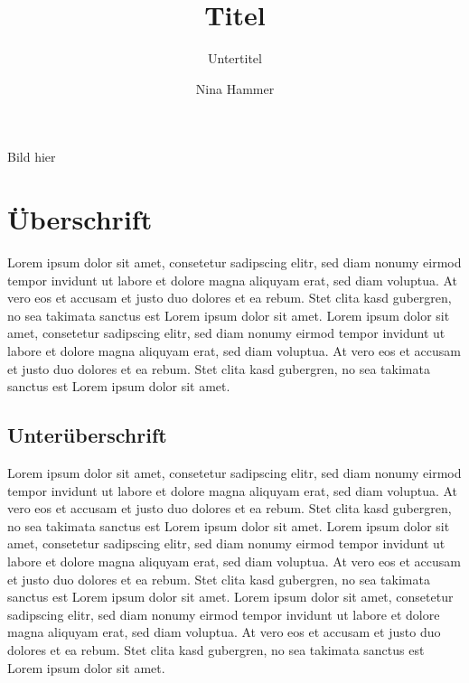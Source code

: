 \documentclass[11pt, manuscript, screen, nonacm=true, natbib=true]{acmart-backref}
\begin{document}
\title{Titel}
\subtitle{Untertitel}

\author{Nina Hammer}

\renewcommand{\shortauthors}{N. Hammer}

\maketitle

\vfill
Bild hier
\vfill

\pagebreak

\tableofcontents

\pagebreak



\section{Überschrift}
Lorem ipsum dolor sit amet, consetetur sadipscing elitr, sed diam nonumy eirmod tempor invidunt ut labore et dolore magna aliquyam erat, sed diam voluptua. At vero eos et accusam et justo duo dolores et ea rebum. Stet clita kasd gubergren, no sea takimata sanctus est Lorem ipsum dolor sit amet. Lorem ipsum dolor sit amet, consetetur sadipscing elitr, sed diam nonumy eirmod tempor invidunt ut labore et dolore magna aliquyam erat, sed diam voluptua. At vero eos et accusam et justo duo dolores et ea rebum. Stet clita kasd gubergren, no sea takimata sanctus est Lorem ipsum dolor sit amet.
\subsection{Unterüberschrift}
Lorem ipsum dolor sit amet, consetetur sadipscing elitr, sed diam nonumy eirmod tempor invidunt ut labore et dolore magna aliquyam erat, sed diam voluptua. At vero eos et accusam et justo duo dolores et ea rebum. Stet clita kasd gubergren, no sea takimata sanctus est Lorem ipsum dolor sit amet. Lorem ipsum dolor sit amet, consetetur sadipscing elitr, sed diam nonumy eirmod tempor invidunt ut labore et dolore magna aliquyam erat, sed diam voluptua. At vero eos et accusam et justo duo dolores et ea rebum. Stet clita kasd gubergren, no sea takimata sanctus est Lorem ipsum dolor sit amet. Lorem ipsum dolor sit amet, consetetur sadipscing elitr, sed diam nonumy eirmod tempor invidunt ut labore et dolore magna aliquyam erat, sed diam voluptua. At vero eos et accusam et justo duo dolores et ea rebum. Stet clita kasd gubergren, no sea takimata sanctus est Lorem ipsum dolor sit amet.   
\end{document}
